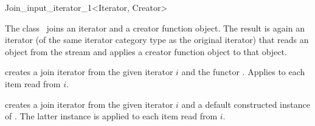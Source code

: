 \begin{ccRefClass}{Join_input_iterator_1<Iterator, Creator>}
  \label{sectionJoinInputIterator}
  
  \ccDefinition The class \ccRefName\ joins an iterator and a creator
  function object. The result is again an iterator (of the same
  iterator category type as the original iterator) that reads an object
  from the stream and applies a creator function object to that
  object.

  
  \ccIsModel {}

  \ccTypes
  
  \ccCreation{}
  
   {creates a join iterator from the given iterator $i$
    and the functor . Applies  to each item
    read from $i$.}

   {creates a join
    iterator from the given iterator $i$ and a default constructed
    instance of . The latter instance is applied to each
    item read from $i$.}

  \ccSeeAlso
\end{ccRefClass}


